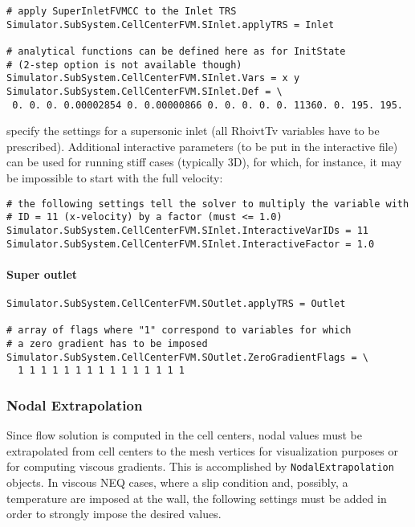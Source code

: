 \documentclass[11pt]{article}
\begin{document}
\begin{verbatim}
# apply SuperInletFVMCC to the Inlet TRS
Simulator.SubSystem.CellCenterFVM.SInlet.applyTRS = Inlet

# analytical functions can be defined here as for InitState 
# (2-step option is not available though)
Simulator.SubSystem.CellCenterFVM.SInlet.Vars = x y
Simulator.SubSystem.CellCenterFVM.SInlet.Def = \
 0. 0. 0. 0.00002854 0. 0.00000866 0. 0. 0. 0. 0. 11360. 0. 195. 195.
\end{verbatim}
specify the settings for a supersonic inlet (all RhoivtTv variables have to be prescribed).
Additional interactive parameters (to be put in the interactive file) can be used 
for running stiff cases (typically 3D), for which, for instance, it may be impossible 
to start with the full velocity:

\begin{verbatim}
# the following settings tell the solver to multiply the variable with 
# ID = 11 (x-velocity) by a factor (must <= 1.0)
Simulator.SubSystem.CellCenterFVM.SInlet.InteractiveVarIDs = 11
Simulator.SubSystem.CellCenterFVM.SInlet.InteractiveFactor = 1.0
\end{verbatim}

\paragraph{Super outlet}

\begin{verbatim}
Simulator.SubSystem.CellCenterFVM.SOutlet.applyTRS = Outlet

# array of flags where "1" correspond to variables for which 
# a zero gradient has to be imposed
Simulator.SubSystem.CellCenterFVM.SOutlet.ZeroGradientFlags = \
  1 1 1 1 1 1 1 1 1 1 1 1 1 1 1
\end{verbatim}

\subsubsection{Nodal Extrapolation}

Since flow solution is computed in the cell centers, nodal values must be extrapolated from cell centers 
to the mesh vertices for visualization purposes or for computing viscous gradients. This is accomplished by 
{\tt NodalExtrapolation} objects. In viscous NEQ cases, where a slip condition and, possibly, a temperature 
are imposed at the wall, the following settings must be added in order to strongly impose the desired values.
\end{document}
